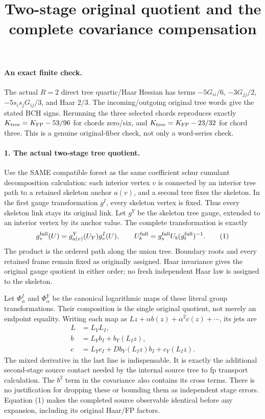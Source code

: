 \documentclass[11pt]{article}
\title{Two-stage original quotient and the complete covariance compensation}\author{}\date{}
\begin{document}
\maketitle
\paragraph{An exact finite check.}
The actual $R=2$ direct tree
quartic/Haar Hessian has terms $-5G_{ii}/6$, $-3G_{jj}/2$,
$-5s_is_jG_{ij}/3$, and Haar $2/3$. The incoming/outgoing original
tree words give the stated BCH signs. Rerunning the three selected
chords reproduces exactly $K_{\rm tree}=K_{\rm FP}-53/96$ for chords
zero/six, and $K_{\rm tree}=K_{\rm FP}-23/32$ for chord three.
This is a genuine original-fiber check, not only a word-series check.

\paragraph{1. The actual two-stage tree quotient.}
Use the SAME compatible forest as the same coefficient schur cumulant decomposition calculation: each interior vertex $v$ is
connected by an interior tree path to a retained skeleton anchor
$a(v)$, and a second tree fixes the skeleton. In the first gauge
transformation $g^I$, every skeleton vertex is fixed. Thus every
skeleton link stays its original link. Let $g^Y$ be the skeleton
tree gauge, extended to an interior vertex by its anchor value.
The complete transformation is exactly
\[
 g_v^{\rm full}(U)=g^Y_{a(v)}(U_Y)g^I_v(U),\qquad
 U_b^{\rm full}=g_s^{\rm full}U_b(g_t^{\rm full})^{-1}. \tag{1}
\]
The product is the ordered path along the union tree. Boundary roots
and every retained frame remain fixed as originally assigned.
Haar invariance gives the original gauge quotient in either order;
no fresh independent Haar law is assigned to the skeleton.

Let $\Phi^I_\alpha$ and $\Phi^Y_\alpha$ be the canonical logarithmic
maps of these literal group transformations. Their composition is
the single original quotient, not merely an endpoint equality.
Writing each map as $Lz+\alpha b(z)+\alpha^2c(z)+\cdots$, its jets are
\[
 \begin{split}
 L&=L_YL_I,\\
 b&=L_Yb_I+b_Y(L_Iz),\\
 c&=L_Yc_I+Db_Y(L_Iz)b_I+c_Y(L_Iz).
 \end{split} \tag{2}
\]
The mixed derivative in the last line is indispensable. It is exactly
the additional second-stage source contact needed by the internal source tree to fp transport calculation. The $b^2$
term in the covariance also contains its cross terms. There is no
justification for dropping these or bounding them as independent
stage errors. Equation (1) makes the completed source observable
identical before any expansion, including its original Haar/FP factors.
\end{document}
